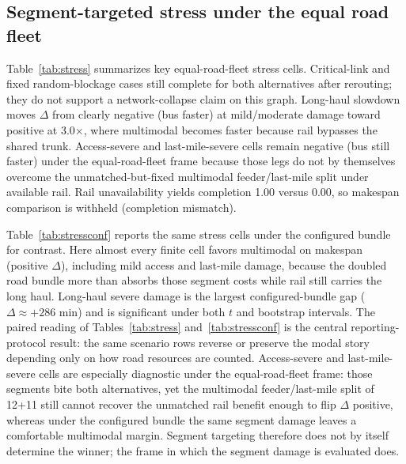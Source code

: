 \documentclass{ieeeaccess}
\begin{document}
\subsection{Segment-targeted stress under the equal road fleet}
Table~\ref{tab:stress} summarizes key equal-road-fleet stress cells. Critical-link and fixed random-blockage cases still complete for both alternatives after rerouting; they do not support a network-collapse claim on this graph. Long-haul slowdown moves $\Delta$ from clearly negative (bus faster) at mild/moderate damage toward positive at 3.0$\times$, where multimodal becomes faster because rail bypasses the shared trunk. Access-severe and last-mile-severe cells remain negative (bus still faster) under the equal-road-fleet frame because those legs do not by themselves overcome the unmatched-but-fixed multimodal feeder/last-mile split under available rail. Rail unavailability yields completion 1.00 versus 0.00, so makespan comparison is withheld (completion mismatch).

Table~\ref{tab:stressconf} reports the same stress cells under the configured bundle for contrast. Here almost every finite cell favors multimodal on makespan (positive $\Delta$), including mild access and last-mile damage, because the doubled road bundle more than absorbs those segment costs while rail still carries the long haul. Long-haul severe damage is the largest configured-bundle gap ($\Delta \approx +286$ min) and is significant under both $t$ and bootstrap intervals. The paired reading of Tables~\ref{tab:stress} and~\ref{tab:stressconf} is the central reporting-protocol result: the same scenario rows reverse or preserve the modal story depending only on how road resources are counted. Access-severe and last-mile-severe cells are especially diagnostic under the equal-road-fleet frame: those segments bite both alternatives, yet the multimodal feeder/last-mile split of 12+11 still cannot recover the unmatched rail benefit enough to flip $\Delta$ positive, whereas under the configured bundle the same segment damage leaves a comfortable multimodal margin. Segment targeting therefore does not by itself determine the winner; the frame in which the segment damage is evaluated does.
\end{document}
